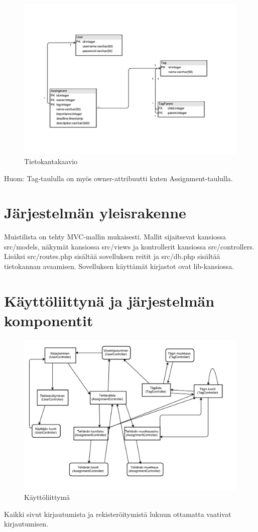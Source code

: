 \documentclass[a4paper, 12pt, finnish]{article}
\begin{document}
\begin{figure}[h]
  \caption{Tietokantakaavio}
  \centering
  \includegraphics[scale=0.7]{tietokantakaavio}
\end{figure}

Huom: Tag-taululla on myös owner-attribuutti kuten Assignment-taululla.

\section{Järjestelmän yleisrakenne}
Muistilista on tehty MVC-mallin mukaisesti. Mallit sijaitsevat kansiossa src/models,
näkymät kansiossa src/views ja kontrollerit kansiossa src/controllers. Lisäksi src/routes.php
sisältää sovelluksen reitit ja src/db.php sisältää tietokannan avaamisen. Sovelluksen käyttämät
kirjastot ovat lib-kansiossa.

\section{Käyttöliittynä ja järjestelmän komponentit}

\begin{figure}[h]
  \caption{Käyttöliittymä}
  \centering
  \includegraphics[scale=0.6]{kayttoliittyma}
\end{figure}
Kaikki sivut kirjautumista ja rekisteröitymistä lukuun ottamatta vaativat kirjautumisen.
\end{document}
